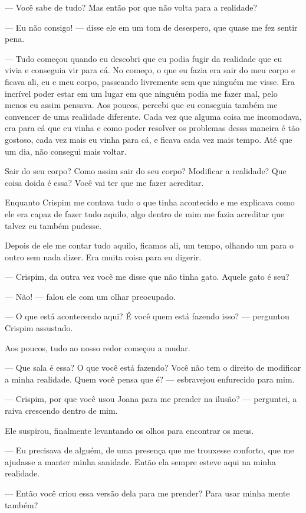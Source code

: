 — Você sabe de tudo? Mas então por que não volta para a realidade?

— Eu não consigo! — disse ele em um tom de desespero, que quase me fez sentir pena.

— Tudo começou quando eu descobri que eu podia fugir da realidade que eu vivia e conseguia vir para cá. No começo, o que eu fazia era sair do meu corpo e ficava ali, eu e meu corpo, passeando livremente sem que ninguém me visse. Era incrível poder estar em um lugar em que ninguém podia me fazer mal, pelo menos eu assim pensava. Aos poucos, percebi que eu conseguia também me convencer de uma realidade diferente. Cada vez que alguma coisa me incomodava, era para cá que eu vinha e como poder resolver os problemas dessa maneira é tão gostoso, cada vez mais eu vinha para cá, e ficava cada vez mais tempo. Até que um dia, não consegui mais voltar.

Sair do seu corpo? Como assim sair do seu corpo? Modificar a realidade? Que coisa doida é essa? Você vai ter que me fazer acreditar.

Enquanto Crispim me contava tudo o que tinha acontecido e me explicava como ele era capaz de fazer tudo aquilo, algo dentro de mim me fazia acreditar que talvez eu também pudesse.

Depois de ele me contar tudo aquilo, ficamos ali, um tempo, olhando um para o outro sem nada dizer. Era muita coisa para eu digerir.

— Crispim, da outra vez você me disse que não tinha gato. Aquele gato é seu?

— Não! — falou ele com um olhar preocupado.

— O que está acontecendo aqui? É você quem está fazendo isso? — perguntou Crispim assustado.

Aos poucos, tudo ao nosso redor começou a mudar.

— Que sala é essa? O que você está fazendo? Você não tem o direito de modificar a minha realidade. Quem você pensa que é? — esbravejou enfurecido para mim.

— Crispim, por que você usou Joana para me prender na ilusão? — perguntei, a raiva crescendo dentro de mim.

Ele suspirou, finalmente levantando os olhos para encontrar os meus.

— Eu precisava de alguém, de uma presença que me trouxesse conforto, que me ajudasse a manter minha sanidade. Então ela sempre esteve aqui na minha realidade.

— Então você criou essa versão dela para me prender? Para usar minha mente também?

